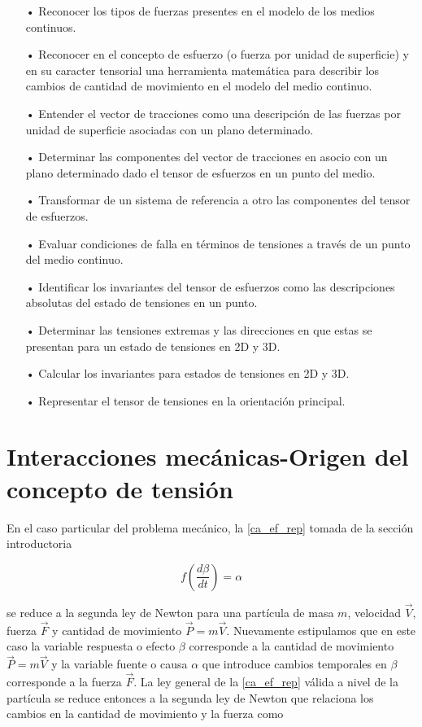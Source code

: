 \documentclass[../notas medios.tex]{subfiles}
\begin{document}
\begin{itemize}
\item[•] Reconocer los tipos de fuerzas presentes en el modelo de los medios continuos.
\item[•] Reconocer en el concepto de esfuerzo (o fuerza por unidad de superficie) y en su caracter tensorial una herramienta matemática para describir los cambios de cantidad de movimiento en el modelo del medio continuo.
\item[•] Entender el vector de tracciones como una descripción de las fuerzas por unidad de superficie asociadas con un plano determinado.
\item[•] Determinar las componentes del vector de tracciones en asocio con un plano determinado dado el tensor de esfuerzos en un punto del medio.
\item[•] Transformar de un sistema de referencia a otro las componentes del tensor de esfuerzos.
\item[•] Evaluar condiciones de falla en términos de tensiones a través de un punto del medio continuo. 
\item[•] Identificar los invariantes del tensor de esfuerzos como las descripciones absolutas del estado de tensiones en un punto.
\item[•] Determinar las tensiones extremas y las direcciones en que estas se presentan para un estado de tensiones en 2D y 3D.
\item[•] Calcular los invariantes para estados de tensiones en 2D y 3D.
\item[•] Representar el tensor de tensiones en la orientación principal.
\end{itemize}


\section{Interacciones mecánicas-Origen del concepto de tensión}

En el caso particular del problema mecánico, la \cref{ca_ef_rep} tomada de la sección introductoria

\begin{equation}
f\left( {\frac{{d\beta }}{{dt}}} \right) = \alpha
\label{ca_ef_rep}
\end{equation}

se reduce a la segunda ley de Newton para una partícula de masa $m$, velocidad
$\vec V$, fuerza $\vec F$ y cantidad de movimiento $\vec P = m\vec V$.
Nuevamente estipulamos que en este caso la variable respuesta o efecto $\beta$ 
corresponde a la cantidad de movimiento $\vec P = m\vec V$ y la variable fuente
o causa $\alpha$ que introduce cambios temporales en $\beta$ corresponde a la
fuerza $\vec F$. La ley general de la \cref{ca_ef_rep} válida a nivel de la
partícula se reduce entonces a la segunda ley de Newton que relaciona los
cambios en la cantidad de movimiento y la fuerza como
\end{document}
